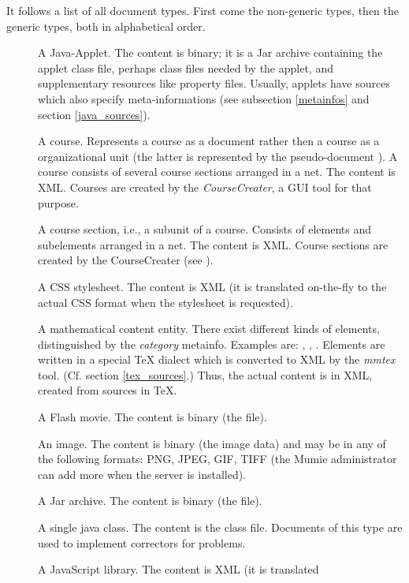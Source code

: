 \documentclass{generic}
\begin{document}
It follows a list of all document types. First come the non-generic types, then
the generic types, both in alphabetical order.

\begin{description}
\item[] A Java-Applet. The content is binary; it is a Jar archive
  containing the applet class file, perhaps class files needed by the applet,
  and supplementary resources like property files. Usually, applets have
  sources which also specify meta-informations (see subsection \ref{metainfos}
  and section \ref{java_sources}).
\item[] A course. Represents a course as a document rather then a
  course as a organizational unit (the latter is represented by the
  pseudo-document ). A course consists of several course sections
  arranged in a net. The content is XML. Courses are created by the
  \emph{CourseCreater}, a GUI tool for that purpose.
\item[] A course section, i.e., a subunit of a
  course. Consists of elements and subelements arranged in a net. The content
  is XML. Course sections are created by the CourseCreater (see ).
\item[] A CSS stylesheet. The content is XML (it is
  translated on-the-fly to the actual CSS format when the stylesheet is
  requested).
\item[] A mathematical content entity. There exist different
  kinds of elements, distinguished by the \emph{category} metainfo. Examples
  are: , , . Elements are
  written in a special TeX dialect which is converted to XML by the
  \emph{mmtex} tool. (Cf. section \ref{tex_sources}.) Thus, the actual content
  is in XML, created from sources in TeX.
\item[] A Flash movie. The content is binary (the  file).
\item[] An image. The content is binary (the image data) and may be
  in any of the following formats: PNG, JPEG, GIF, TIFF (the Mumie
  administrator can add more when the server is installed).
\item[] A Jar archive. The content is binary (the  file).
\item[] A single java class. The content is the class
  file. Documents of this type are used to implement correctors for problems.
\item[] A JavaScript library. The content is XML (it is translated

\end{description}
\end{document}
